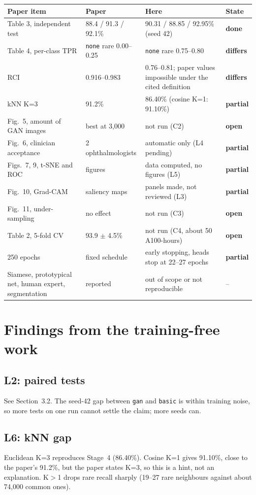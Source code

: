 \documentclass[10pt,a4paper]{article}
\newcommand{\done}{\textcolor{good}{\textbf{done}}}
\newcommand{\partly}{\textcolor{warn}{\textbf{partial}}}
\newcommand{\todo}{\textcolor{bad}{\textbf{open}}}
\begin{document}
\noindent
\begin{tabularx}{\linewidth}{@{}l Y Y l@{}}
\toprule
Paper item & Paper & Here & State \\
\midrule
Table 3, independent test & 88.4 / 91.3 / 92.1\% & 90.31 / 88.85 / 92.95\% (seed 42) & \done \\
Table 4, per-class TPR & \texttt{none} rare 0.00--0.25 & \texttt{none} rare 0.75--0.80 & \textcolor{bad}{\textbf{differs}} \\
RCI & 0.916--0.983 & 0.76--0.81; paper values impossible under the cited definition & \textcolor{bad}{\textbf{differs}} \\
kNN K=3 & 91.2\% & 86.40\% (cosine K=1: 91.10\%) & \partly \\
Fig.~5, amount of GAN images & best at 3,000 & not run (C2) & \todo \\
Fig.~6, clinician acceptance & 2 ophthalmologists & automatic only (L4 pending) & \partly \\
Figs.~7, 9, t-SNE and ROC & figures & data computed, no figures (L5) & \partly \\
Fig.~10, Grad-CAM & saliency maps & panels made, not reviewed (L3) & \partly \\
Fig.~11, under-sampling & no effect & not run (C3) & \todo \\
Table 2, 5-fold CV & 93.9 $\pm$ 4.5\% & not run (C4, about 50 A100-hours) & \todo \\
250 epochs & fixed schedule & early stopping, heads stop at 22--27 epochs & \partly \\
Siamese, prototypical net, human expert, segmentation & reported & out of scope or not reproducible & -- \\
\bottomrule
\end{tabularx}

\section{Findings from the training-free work}

\subsection{L2: paired tests}
See Section~3.2. The seed-42 gap between \texttt{gan} and \texttt{basic} is within
training noise, so more tests on one run cannot settle the claim; more seeds can.

\subsection{L6: kNN gap}
Euclidean K=3 reproduces Stage~4 (86.40\%). Cosine K=1 gives 91.10\%, close to the paper's
91.2\%, but the paper states K=3, so this is a hint, not an explanation. K$>$1 drops rare
recall sharply (19--27 rare neighbours against about 74,000 common ones).
\end{document}
